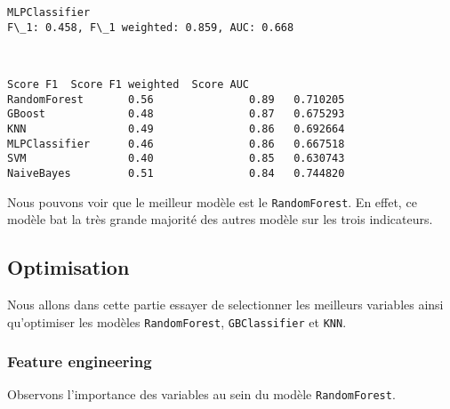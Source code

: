 \documentclass[11pt]{article}
\begin{document}
    \begin{Verbatim}[commandchars=\\\{\}]
MLPClassifier
F\_1: 0.458, F\_1 weighted: 0.859, AUC: 0.668
    \end{Verbatim}

    \begin{center}
    \end{center}
    { \hspace*{\fill} \\}
    
    
    \begin{Verbatim}[commandchars=\\\{\}]
               Score F1  Score F1 weighted  Score AUC
RandomForest       0.56               0.89   0.710205
GBoost             0.48               0.87   0.675293
KNN                0.49               0.86   0.692664
MLPClassifier      0.46               0.86   0.667518
SVM                0.40               0.85   0.630743
NaiveBayes         0.51               0.84   0.744820
    \end{Verbatim}

    
    Nous pouvons voir que le meilleur modèle est le \texttt{RandomForest}.
En effet, ce modèle bat la très grande majorité des autres modèle sur
les trois indicateurs.

\hypertarget{optimisation}{%
\subsection{Optimisation}\label{optimisation}}

Nous allons dans cette partie essayer de selectionner les meilleurs
variables ainsi qu'optimiser les modèles \texttt{RandomForest},
\texttt{GBClassifier} et \texttt{KNN}.

\hypertarget{feature-engineering}{%
\subsubsection{Feature engineering}\label{feature-engineering}}

Observons l'importance des variables au sein du modèle
\texttt{RandomForest}.
\end{document}
